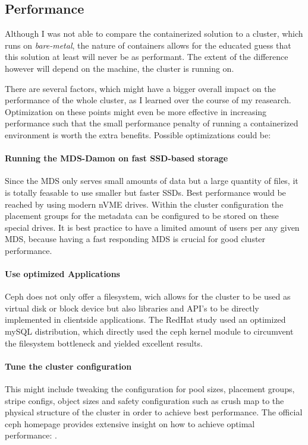 \documentclass[titlepage, a4paper, 11pt]{scrartcl}
\begin{document}
        \subsection{Performance}\label{performance:tuning}

            Although I was not able to compare the containerized solution to a cluster, which runs on \textit{bare-metal}, 
            the nature of containers allows for the educated guess that this solution at least will never be as performant. The extent of the difference however will depend on the machine, the cluster is running on. 

            There are several factors, which might have a bigger overall impact on the performance of the whole cluster, as I learned over the course of my reasearch. Optimization on these points might even be more effective in increasing performance such that the small performance penalty of running a containerized environment is worth the extra benefits. Possible optimizations could be:

            \paragraph{Running the MDS-Damon on fast SSD-based storage} Since the MDS only serves small amounts of data but a large quantity of files, it is totally feasable to use smaller but faster SSDs. Best performance would be reached by using modern nVME drives. Within the cluster configuration the placement groups for the metadata can be configured to be stored on these special drives. It is best practice to have a limited amount of users per any given MDS, because having a fast responding MDS is crucial for good cluster performance.

            \paragraph{Use optimized Applications} Ceph does not only offer a filesystem, wich allows for the cluster to be used as virtual disk or block device but also libraries and API's to be directly implemented in clientside applications. The RedHat study\cite{redhatstudy} used an optimized mySQL distribution, which directly used the ceph kernel module to circumvent the filesystem bottleneck and yielded excellent results.

            \paragraph{Tune the cluster configuration} This might include tweaking the configuration for pool sizes, placement groups, stripe configs, object sizes and safety configuration such as crush map to the physical structure of the cluster in order to achieve best performance. The official ceph homepage provides extensive insight on how to achieve optimal performance: \cite{CephMakingCephFaster}.
\end{document}
